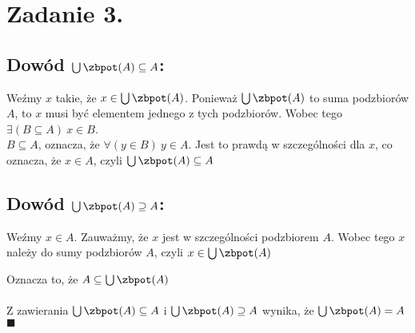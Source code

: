 \documentclass{article}
\begin{document}
\section*{Zadanie 3.}

\subsection*{Dowód $\bigcup \zbpot(A) \subseteq A$:}

Weźmy $x$ takie, że $x \in \bigcup \zbpot(A)$. Ponieważ $\bigcup \zbpot(A)$ to suma podzbiorów $A$, to $x$ musi być elementem jednego z tych podzbiorów. Wobec tego $\exists(B \subseteq A) \ x\in B$.
\\
$B \subseteq A$, oznacza, że $\forall(y\in B)\ y\in A$. Jest to prawdą w szczególności dla $x$, co oznacza, że $x\in A$, czyli  $\bigcup \zbpot(A) \subseteq A$

\subsection*{Dowód $\bigcup \zbpot(A) \supseteq A$:}

Weźmy $x \in A$. Zauważmy, że $x$ jest w szczególności podzbiorem $A$. Wobec tego $x$ należy do sumy podzbiorów $A$, czyli $x \in \bigcup \zbpot(A)$

Oznacza to, że $A \subseteq \bigcup \zbpot(A)$
\\\\
Z zawierania $\bigcup \zbpot(A) \subseteq A$ i $\bigcup \zbpot(A) \supseteq A$ wynika, że $\bigcup \zbpot(A) = A$\\
$\blacksquare$
\end{document}

